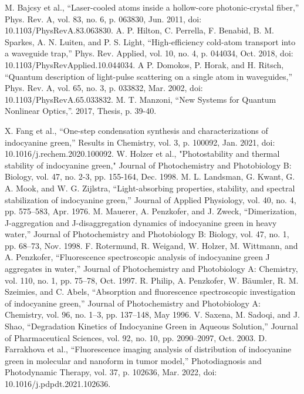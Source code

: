 \begin{thebibliography}{99}
 M. Bajcsy et al., “Laser-cooled atoms inside a hollow-core photonic-crystal fiber,” Phys. Rev. A, vol. 83, no. 6, p. 063830, Jun. 2011, doi: 10.1103/PhysRevA.83.063830. 
 A. P. Hilton, C. Perrella, F. Benabid, B. M. Sparkes, A. N. Luiten, and P. S. Light, “High-efficiency cold-atom transport into a waveguide trap,” Phys. Rev. Applied, vol. 10, no. 4, p. 044034, Oct. 2018, doi: 10.1103/PhysRevApplied.10.044034. A
 P. Domokos, P. Horak, and H. Ritsch, “Quantum description of light-pulse scattering on a single atom in waveguides,” Phys. Rev. A, vol. 65, no. 3, p. 033832, Mar. 2002, doi: 10.1103/PhysRevA.65.033832.
 M. T. Manzoni, “New Systems for Quantum Nonlinear Optics,”. 2017, Thesis, p. 39-40.

	 X. Fang et al., “One-step condensation synthesis and characterizations of indocyanine green,” Results in Chemistry, vol. 3, p. 100092, Jan. 2021, doi: 10.1016/j.rechem.2020.100092.
W. Holzer et al., "Photostability and thermal stability of indocyanine green," Journal of Photochemistry and Photobiology B: Biology,  vol. 47, no. 2-3, pp. 155-164, Dec. 1998.
M. L. Landsman, G. Kwant, G. A. Mook, and W. G. Zijlstra, “Light-absorbing properties, stability, and spectral stabilization of indocyanine green,” Journal of Applied Physiology, vol. 40, no. 4, pp. 575–583, Apr. 1976.
M. Mauerer, A. Penzkofer, and J. Zweck, “Dimerization, J-aggregation and J-disaggregation dynamics of indocyanine green in heavy water,” Journal of Photochemistry and Photobiology B: Biology, vol. 47, no. 1, pp. 68–73, Nov. 1998.
F. Rotermund, R. Weigand, W. Holzer, M. Wittmann, and A. Penzkofer, “Fluorescence spectroscopic analysis of indocyanine green J aggregates in water,” Journal of Photochemistry and Photobiology A: Chemistry, vol. 110, no. 1, pp. 75–78, Oct. 1997.
R. Philip, A. Penzkofer, W. Bäumler, R. M. Szeimies, and C. Abels, “Absorption and fluorescence spectroscopic investigation of indocyanine green,” Journal of Photochemistry and Photobiology A: Chemistry, vol. 96, no. 1–3, pp. 137–148, May 1996.
V. Saxena, M. Sadoqi, and J. Shao, “Degradation Kinetics of Indocyanine Green in Aqueous Solution,” Journal of Pharmaceutical Sciences, vol. 92, no. 10, pp. 2090–2097, Oct. 2003. 
D. Farrakhova et al., “Fluorescence imaging analysis of distribution of indocyanine green in molecular and nanoform in tumor model,” Photodiagnosis and Photodynamic Therapy, vol. 37, p. 102636, Mar. 2022, doi: 10.1016/j.pdpdt.2021.102636.

\end{thebibliography}
